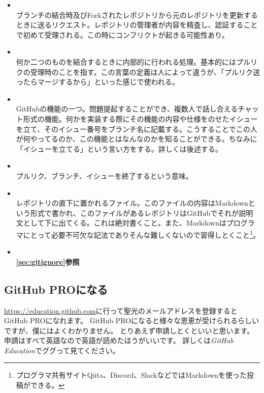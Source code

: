 \documentclass[dvipdfmx,jb5]{jreport}
\begin{document}
\begin{itemize}
      \item {}\\
            ブランチの結合時及びForkされたレポジトリから元のレポジトリを更新するときに送るリクエスト。レポジトリの管理者が内容を精査し、認証することで初めて受理される。この時にコンフリクトが起きる可能性あり。
      \item {}\\
            何か二つのものを結合するときに内部的に行われる処理。基本的にはプルリクの受理時のことを指す。この言葉の定義は人によって違うが、「プルリク送ったらマージするから」といった感じで使われる。
      \item {}\\
            GitHubの機能の一つ。問題提起することができ、複数人で話し合えるチャット形式の機能。何かを実装する際にその機能の内容や仕様をのせたイシューを立て、そのイシュー番号をブランチ名に記載する。こうすることでこの人が何やってるのか、この機能とはなんなのかを知ることができる。ちなみに「イシューを立てる」という言い方をする。詳しくは後述する。
      \item {}\\
            プルリク、ブランチ、イシューを終了するという意味。
      \item {}\\
            レポジトリの直下に置かれるファイル。このファイルの内容はMarkdownという形式で書かれ、このファイルがあるレポジトリはGitHubでそれが説明文として下に出てくる。これは絶対書くこと。また、Markdownはプログラマにとって必要不可欠な記法でありそんな難しくないので習得しとくこと\footnote{プログラマ共有サイトQiita、Discord、SlackなどではMarkdownを使った投稿ができる。}。
      \item {}\\
            {\bf\ref{sec:gitignore}参照}
\end{itemize}


\subsection{GitHub PROになる}
\url{https://education.github.com}に行って聖光のメールアドレスを登録するとGitHub PROになれます。
GitHub PROになると様々な恩恵が受けられるらしいですが、僕にはよくわかりません。
とりあえず申請しとくといいと思います。
申請はすべて英語なので英語が読めたほうがいいです。
詳しくは\emph{GitHub Education}でググって見てください。
\end{document}
